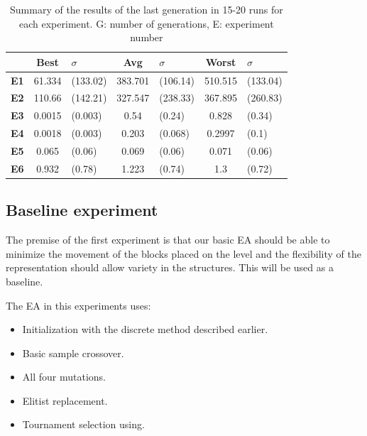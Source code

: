 \documentclass[sigconf]{acmart}
\newcommand{\myfloatalign}{\centering} %
\begin{document}
\begin{table}
	\myfloatalign
	\begin{tabular}{cclclcl}
		& \textbf{Best}& $\sigma$  &\textbf{Avg}&$\sigma$  & 
		\textbf{Worst}&$\sigma$ \\ \hline
		\textbf{E1}&61.334&(133.02)&383.701&(106.14)&510.515&(133.04)\\  \hline
		\textbf{E2}&110.66&(142.21)&327.547&(238.33)&367.895&(260.83)  \\  
		\hline
		\textbf{E3}&0.0015&(0.003)&0.54&(0.24)&0.828&(0.34)   \\  \hline
		\textbf{E4}&0.0018&(0.003)&0.203&(0.068)&0.2997&(0.1)  \\  \hline
		\textbf{E5}& 0.065&(0.06)&0.069&(0.06)&0.071&(0.06)     \\  \hline 
		\textbf{E6}& 0.932&(0.78)&1.223&(0.74)&1.3&(0.72) \\  \hline
		\hline
	\end{tabular}
	\caption{Summary of the results of the last generation in 15-20 runs for 
	each
		experiment.
		G: number of generations, E: experiment 
		number} %
	\label{t:resOver2}
\end{table}

\subsection{Baseline experiment}\label{E1}

The premise of the first experiment is that our basic EA should be able to 
minimize the movement of the blocks placed on the level and the flexibility of 
the representation should allow variety in the structures. This will
be used as a baseline.

The EA in this experiments uses:
\begin{itemize}
	\item  Initialization with the discrete method described earlier.
	\item  Basic sample crossover.
	\item  All four mutations.
	\item  Elitist replacement.
	\item  Tournament selection using.
\end{itemize}
\end{document}
